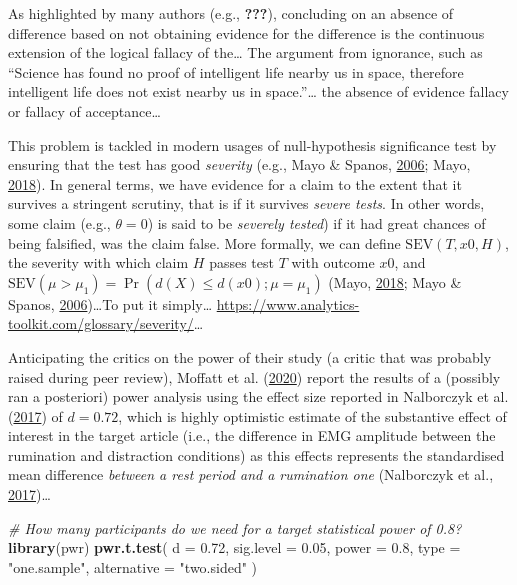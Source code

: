 \documentclass[
  english,
  man,floatsintext]{apa6}
\newenvironment{Shaded}{\begin{snugshade}}{\end{snugshade}}
\newcommand{\CommentTok}[1]{\textcolor[rgb]{0.56,0.35,0.01}{\textit{#1}}}
\newcommand{\DataTypeTok}[1]{\textcolor[rgb]{0.13,0.29,0.53}{#1}}
\newcommand{\FloatTok}[1]{\textcolor[rgb]{0.00,0.00,0.81}{#1}}
\newcommand{\KeywordTok}[1]{\textcolor[rgb]{0.13,0.29,0.53}{\textbf{#1}}}
\newcommand{\NormalTok}[1]{#1}
\newcommand{\StringTok}[1]{\textcolor[rgb]{0.31,0.60,0.02}{#1}}
\begin{document}
As highlighted by many authors (e.g., {\textbf{???}}), concluding on an absence of difference based on not obtaining evidence for the difference is the continuous extension of the logical fallacy of the\ldots{} The argument from ignorance, such as ``Science has found no proof of intelligent life nearby us in space, therefore intelligent life does not exist nearby us in space.''\ldots{} the absence of evidence fallacy or fallacy of acceptance\ldots{}

This problem is tackled in modern usages of null-hypothesis significance test by ensuring that the test has good \emph{severity} (e.g., Mayo \& Spanos, \protect\hyperlink{ref-mayo_severe_2006}{2006}; Mayo, \protect\hyperlink{ref-mayo_statistical_2018}{2018}). In general terms, we have evidence for a claim to the extent that it survives a stringent scrutiny, that is if it survives \emph{severe tests}. In other words, some claim (e.g., \(\theta = 0\)) is said to be \emph{severely tested}) if it had great chances of being falsified, was the claim false. More formally, we can define \(\text{SEV}(T, x0, H)\), the severity with which claim \(H\) passes test \(T\) with outcome \(x0\), and \(\text{SEV}(\mu > \mu_{1}) = \Pr(d(X) \leq d(x0); \mu = \mu_{1})\) (Mayo, \protect\hyperlink{ref-mayo_statistical_2018}{2018}; Mayo \& Spanos, \protect\hyperlink{ref-mayo_severe_2006}{2006})\ldots To put it simply\ldots{} \url{https://www.analytics-toolkit.com/glossary/severity/}\ldots{}

Anticipating the critics on the power of their study (a critic that was probably raised during peer review), Moffatt et al. (\protect\hyperlink{ref-moffatt_inner_2020}{2020}) report the results of a (possibly ran a posteriori) power analysis using the effect size reported in Nalborczyk et al. (\protect\hyperlink{ref-nalborczyk_orofacial_2017}{2017}) of \(d = 0.72\), which is highly optimistic estimate of the substantive effect of interest in the target article (i.e., the difference in EMG amplitude between the rumination and distraction conditions) as this effects represents the standardised mean difference \emph{between a rest period and a rumination one} (Nalborczyk et al., \protect\hyperlink{ref-nalborczyk_orofacial_2017}{2017})\ldots{}

\begin{Shaded}
\begin{Highlighting}[]
\CommentTok{\# How many participants do we need for a target statistical power of 0.8?}
\KeywordTok{library}\NormalTok{(pwr)}
\KeywordTok{pwr.t.test}\NormalTok{(}
  \DataTypeTok{d =} \FloatTok{0.72}\NormalTok{, }\DataTypeTok{sig.level =} \FloatTok{0.05}\NormalTok{, }\DataTypeTok{power =} \FloatTok{0.8}\NormalTok{,}
  \DataTypeTok{type =} \StringTok{"one.sample"}\NormalTok{, }\DataTypeTok{alternative =} \StringTok{"two.sided"}
\NormalTok{  )}
\end{Highlighting}
\end{Shaded}
\end{document}
